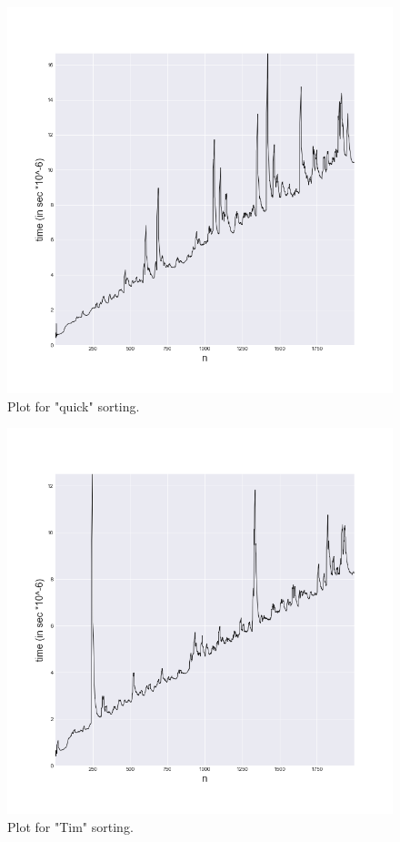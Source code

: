 \documentclass[a4paper,article,14pt]{extarticle}
\begin{document}
	\begin{figure}[h]
		\centering
		\includegraphics[scale=0.5]{quickSort.png}
		\caption{Plot for "quick" sorting.}
		\label{quick}
	\end{figure} 
	\begin{figure}[h]
		\centering
		\includegraphics[scale=0.5]{timSort.png}
		\caption{Plot for "Tim" sorting.}
		\label{tim}
	\end{figure} 
\end{document}
